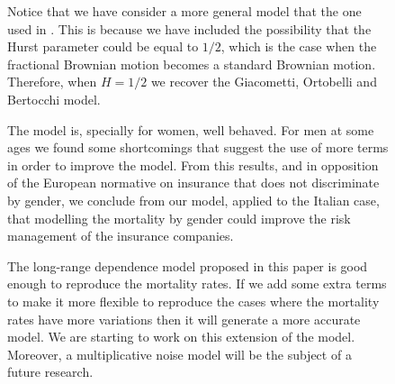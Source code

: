 \documentclass[smallextended]{svjour3}
\begin{document}
\begin{figure}[H]
	Notice that we have consider a more general model that the one used in
\cite{gi-or-be}. This is because we have included the possibility that the
Hurst parameter could be equal to $1/2$, which is the case when the fractional
Brownian motion becomes a standard Brownian motion. Therefore,
when $H=1/2$ we recover the  Giacometti, Ortobelli and Bertocchi model.







	The model is, specially for women, well behaved. For men at some ages we found
some shortcomings that suggest the use of more terms in order to improve the model. 
From this results, and in opposition of the European normative on insurance 
that does not discriminate by gender, we conclude from our model, applied 
to the Italian case, that modelling the mortality by gender could improve 
the risk management of the insurance companies.


	The long-range dependence model proposed in this paper is good
enough to reproduce the mortality rates. If we add some extra terms to make it
more flexible to reproduce the cases where the mortality rates have more
variations then it will generate a more accurate model. We are starting to work
on this extension of the model. Moreover, a multiplicative noise model will be
the subject of a future research.



{}





\end{figure}
\end{document}
